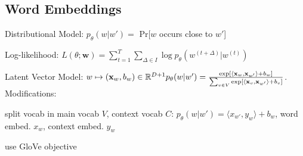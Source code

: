 \documentclass[a4paper, 11pt, landscape]{article}
\begin{document}
\begin{multicols*}{3}
\section{Word Embeddings}
\begin{compactdesc}
  \item[Distributional Model:] $p_\theta(w|w') = $ Pr[$w$ occurs close to $w'$]
  \item[Log-likelihood:] $L(\theta; \mathbf{w}) = \sum_{t=1}^T\sum_{\Delta \in I}{\log p_\theta(w^{(t+\Delta)}|w^{(t)})}$
  \item[Latent Vector Model:] $w \mapsto (\mathbf{x}_w, b_w) \in \mathbb{R}^{D+1} \\p_{\theta}(w|w') = \frac{\exp[\langle \mathbf{x}_w,\mathbf{x}_{w'}\rangle + b_w]}{\sum_{v\in V}{\exp[\langle \mathbf{x}_v,\mathbf{x}_{w'}\rangle + b_v ]}}$.
  Modifications:
  \begin{inparaitem}[\color{red}\textbullet]
  \item split vocab in main vocab $V$, context vocab $C$: $p_{\theta}(w|w') = \langle x_{w'}, y_{w} \rangle + b_w$, word embed. $x_w$, context embed. $y_w$
  \item use GloVe objective
  \end{inparaitem}
\end{compactdesc}


\end{multicols*}
\end{document}
